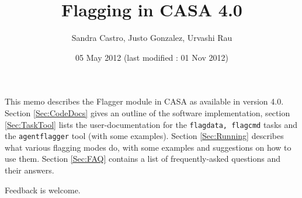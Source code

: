 \documentclass[11pt]{article}
\begin{document}
\title{Flagging in CASA 4.0}
\author{Sandra Castro, Justo Gonzalez, Urvashi Rau}
\date{05 May 2012 (last modified : 01 Nov 2012)}
\maketitle

This memo describes the Flagger module in CASA as available in version 4.0. Section \ref{Sec:CodeDocs} gives an outline of the software implementation, section \ref{Sec:TaskTool} lists the user-documentation for the {\tt flagdata, flagcmd} tasks and the {\tt agentflagger} tool (with some examples).  Section \ref{Sec:Running} describes what various flagging modes do, with some examples and suggestions on how to use them. Section \ref{Sec:FAQ} contains a list of frequently-asked questions and their answers.

Feedback is welcome.

\tableofcontents




\end{document}

